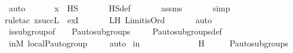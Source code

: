 \begin{isabellebody}
\ auto\ \isanewline
\ \ \isamarkupfalse%
\ \isamarkupfalse%
\ {\isachardoublequoteopen}x\ {\isasymin}\ HS{\isachardoublequoteclose}\ \isanewline
\ \ \ \ \isamarkupfalse%
\ HS{\isacharunderscore}{\kern0pt}def\ \isanewline
\ \ \ \ \isamarkupfalse%
\ assms\ \isanewline
\ \ \ \ \isamarkupfalse%
\ simp\ \isanewline
\ \ \ \ \isamarkupfalse%
{\isacharparenleft}{\kern0pt}rule{\isacharunderscore}{\kern0pt}tac\ x{\isacharequal}{\kern0pt}{\isachardoublequoteopen}succ{\isacharparenleft}{\kern0pt}L{\isacharparenright}{\kern0pt}{\isachardoublequoteclose}\ \ exI{\isacharparenright}{\kern0pt}\ \isanewline
\ \ \ \ \isamarkupfalse%
\ LH\ Limit{\isacharunderscore}{\kern0pt}is{\isacharunderscore}{\kern0pt}Ord\ \isanewline
\ \ \ \ \isamarkupfalse%
\ auto\isanewline
{}\isamarkupfalse%
%
\endisatagproof
{\isafoldproof}%
%
\isadelimproof
\isanewline
%
\endisadelimproof
\isanewline
{}\isamarkupfalse%
\ {\isasymG}{\isacharunderscore}{\kern0pt}is{\isacharunderscore}{\kern0pt}subgroup{\isacharunderscore}{\kern0pt}of{\isacharunderscore}{\kern0pt}{\isasymG}\ {\isacharcolon}{\kern0pt}\ {\isachardoublequoteopen}{\isasymG}\ {\isasymin}\ P{\isacharunderscore}{\kern0pt}auto{\isacharunderscore}{\kern0pt}subgroups{\isacharparenleft}{\kern0pt}{\isasymG}{\isacharparenright}{\kern0pt}{\isachardoublequoteclose}\ \isanewline
%
\isadelimproof
\ \ %
\endisadelimproof
%
\isatagproof
{}\isamarkupfalse%
\ P{\isacharunderscore}{\kern0pt}auto{\isacharunderscore}{\kern0pt}subgroups{\isacharunderscore}{\kern0pt}def\ \isanewline
\ \ \isamarkupfalse%
\ {\isasymG}{\isacharunderscore}{\kern0pt}in{\isacharunderscore}{\kern0pt}M\ local{\isachardot}{\kern0pt}{\isasymG}{\isacharunderscore}{\kern0pt}P{\isacharunderscore}{\kern0pt}auto{\isacharunderscore}{\kern0pt}group\ \isanewline
\ \ \isamarkupfalse%
\ auto%
\endisatagproof
{\isafoldproof}%
%
\isadelimproof
\isanewline
%
\endisadelimproof
\isanewline
{}\isamarkupfalse%
\ {\isasymG}{\isacharunderscore}{\kern0pt}in{\isacharunderscore}{\kern0pt}{\isasymF}\ {\isacharcolon}{\kern0pt}\ {\isachardoublequoteopen}{\isasymG}\ {\isasymin}\ {\isasymF}{\isachardoublequoteclose}\ \isanewline
%
\isadelimproof
%
\endisadelimproof
%
\isatagproof
{}\isamarkupfalse%
\ {\isacharminus}{\kern0pt}\ \isanewline
\ \ \isamarkupfalse%
\ {\isasymI}\ \ H{\isacharcolon}{\kern0pt}\ {\isachardoublequoteopen}{\isasymI}\ {\isasymin}\ {\isasymF}{\isachardoublequoteclose}\ {\isachardoublequoteopen}{\isasymI}\ {\isasymin}\ P{\isacharunderscore}{\kern0pt}auto{\isacharunderscore}{\kern0pt}subgroups{\isacharparenleft}{\kern0pt}{\isasymG}{\isacharparenright}{\kern0pt}{\isachardoublequoteclose}\ \ \isamarkupfalse%

\end{isabellebody}
